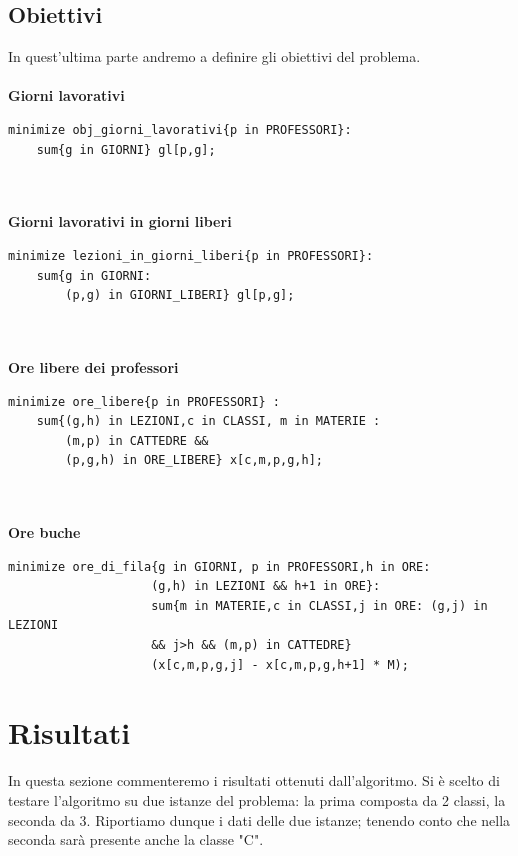 \documentclass{article}
\begin{document}
\subsection{Obiettivi}
In quest'ultima parte andremo a definire gli obiettivi del problema.
\\\\\textbf{Giorni lavorativi}
\begin{verbatim}
minimize obj_giorni_lavorativi{p in PROFESSORI}:
	sum{g in GIORNI} gl[p,g];
\end{verbatim}
\\\\\textbf{Giorni lavorativi in giorni liberi}
\begin{verbatim}
minimize lezioni_in_giorni_liberi{p in PROFESSORI}:
	sum{g in GIORNI:
		(p,g) in GIORNI_LIBERI} gl[p,g];
\end{verbatim}
\\\\\textbf{Ore libere dei professori}
\begin{verbatim}
minimize ore_libere{p in PROFESSORI} :
	sum{(g,h) in LEZIONI,c in CLASSI, m in MATERIE :
		(m,p) in CATTEDRE &&
		(p,g,h) in ORE_LIBERE} x[c,m,p,g,h];
\end{verbatim}
\\\\\textbf{Ore buche}
\begin{verbatim}
minimize ore_di_fila{g in GIORNI, p in PROFESSORI,h in ORE: 
                    (g,h) in LEZIONI && h+1 in ORE}:
                    sum{m in MATERIE,c in CLASSI,j in ORE: (g,j) in LEZIONI
                    && j>h && (m,p) in CATTEDRE}
                    (x[c,m,p,g,j] - x[c,m,p,g,h+1] * M);
\end{verbatim}

\section{Risultati}
In questa sezione commenteremo i risultati ottenuti dall'algoritmo. Si è scelto di testare l'algoritmo su due istanze del problema: la prima composta da 2 classi, la seconda da 3. Riportiamo dunque i dati delle due istanze; tenendo conto che nella seconda sarà presente anche la classe "C".
\end{document}
